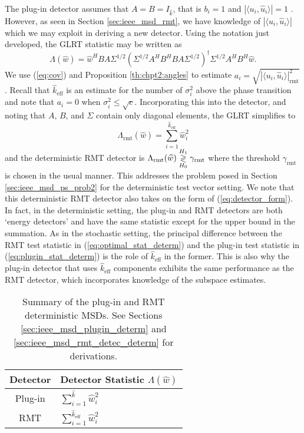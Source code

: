 The plug-in detector assumes that $A=B=I_{\widehat{k}}$, that is $b_i=1$ and $|\langle u_i,\widehat{u}_i\rangle|=1$ . However, as seen in Section \ref{sec:ieee_msd_rmt}, we have knowledge of $|\langle u_i,\widehat{u}_i\rangle|$ which we may exploit in deriving a new detector. Using the notation just developed, the GLRT statistic may be written as
\begin{equation*}
\Lambda(\widehat{w})=\widehat{w}^HBA\Sigma^{1/2}(\Sigma^{1/2}A^HB^HBA\Sigma^{1/2})^{\dagger}\Sigma^{1/2}A^HB^H\widehat{w}.
\end{equation*}
We use (\ref{eq:cov}) and Proposition \ref{th:chpt2:angles} to estimate $a_i=\sqrt{|\langle u_i,\widehat{u}_i\rangle|^2_{\text{rmt}}}$. Recall that $\widehat{k}_{\text{eff}}$ is an estimate for the number of $\sigma_i^2$ above the phase transition and note that $a_i=0$ when $\sigma_i^2\leq\sqrt{c}$. Incorporating this into the detector, and noting that $A$, $B$, and $\Sigma$ contain only diagonal elements, the GLRT simplifies to
\begin{equation}\label{eq:optimal_stat_determ}
\boxed{\Lambda_{\text{rmt}}(\widehat{w}) = \sum_{i=1}^{\widehat{k}_{\text{eff}}}\widehat{w}_i^2}
\end{equation}
and the deterministic RMT detector is $\Lambda_{\text{rmt}}(\widehat{w}) \overset{H_1}{\underset{H_0}{\gtrless}} \gamma_{\text{rmt}}$
where the threshold $\gamma_{\text{rmt}}$ is chosen in the usual manner. This addresses the problem posed in Section \ref{sec:ieee_msd_ps_prob2} for the deterministic test vector setting.  We note that this deterministic RMT detector also takes on the form of (\ref{eq:detector_form}). In fact, in the deterministic setting, the plug-in and RMT detectors are both `energy detectors' and have the same statistic except for the upper bound in the summation. As in the stochastic setting, the principal difference between the RMT test statistic in (\ref{eq:optimal_stat_determ}) and the plug-in test statistic in (\ref{eq:plugin_stat_determ}) is the role of $\widehat{k}_{\text{eff}}$ in the former. This is also why the plug-in detector that uses $\widehat{k}_{\text{eff}}$ components exhibits the same performance as the RMT detector, which incorporates knowledge of the subspace estimates. 
\begin{table*}[ht!]
\centering
\begin{tabular}{cl}\toprule
 Detector & Detector Statistic $\Lambda(\widehat{w})$ \\
\midrule
Plug-in & $\sum_{i=1}^{\widehat{k}}\widehat{w}_i^2$ \\
 RMT& $\sum_{i=1}^{\widehat{k}_{\text{eff}}}\widehat{w}_i^2$ \\
\bottomrule
\end{tabular}
\caption{Summary of the plug-in and RMT deterministic MSDs. See Sections \ref{sec:ieee_msd_plugin_determ} and \ref{sec:ieee_msd_rmt_detec_determ} for derivations.}\vskip-0.2cm
\label{table:summary_determ}
\end{table*}

